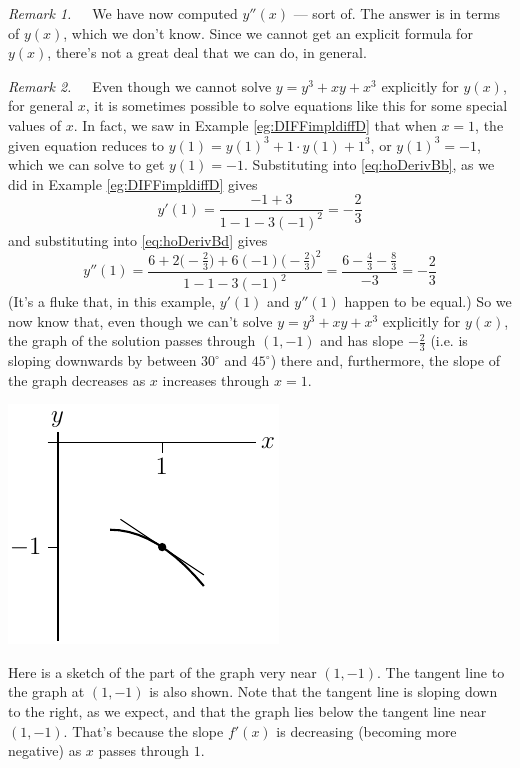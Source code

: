 \begin{eg}
\noindent\emph{Remark 1.}\ \ \ We have now computed $y''(x)$ --- sort of.
The answer is in terms of $y(x)$, which we don't know. Since we cannot
get an explicit formula for $y(x)$, there's not a great deal that we can do,
in general.

\noindent\emph{Remark 2.}\ \ \ Even though we cannot solve
$y=y^3+xy+x^3$ explicitly for $y(x)$, for general $x$, it is sometimes
possible to solve equations like this for some special values of $x$.
In fact, we saw in Example \ref{eg:DIFFimpldiffD} that when $x=1$,
the given equation reduces to $y(1)=y(1)^3+1\cdot y(1)+1^3$, or $y(1)^3=-1$,
which we can solve to get $y(1)=-1$. Substituting into \eqref{eq:hoDerivBb},
as we did in  Example \ref{eg:DIFFimpldiffD} gives
\begin{equation*}
y'(1) = \frac{-1+3}{1-1-3(-1)^2} = -\frac{2}{3}
\end{equation*}
and substituting into \eqref{eq:hoDerivBd} gives
\begin{equation*}
y''(1) = \frac{6+2\big(-\frac{2}{3}\big)+6(-1)\big(-\frac{2}{3}\big)^2}
                             {1-1-3(-1)^2}
   =\frac{6-\frac{4}{3}-\frac{8}{3}}{-3}
   = -\frac{2}{3}
\end{equation*}
(It's a fluke that, in this example, $y'(1)$ and $y''(1)$ happen to be equal.)
So we now know that, even though we can't solve $y=y^3+xy+x^3$ explicitly for
$y(x)$, the graph of the solution passes through $(1,-1)$ and has slope
$-\frac{2}{3}$ (i.e. is sloping downwards by between $30^\circ$ and $45^\circ$)
there and, furthermore, the slope of the graph decreases as $x$
increases through $x=1$.

\begin{efig}
 \begin{center}
 \includegraphics{concaveDown}
 \end{center}
\end{efig}
Here is a sketch of the part of the graph very near $(1, -1)$. The tangent line to the
graph at $(1, -1)$ is also shown. Note that the tangent line is sloping down to the right,
as we expect, and that the graph lies below the tangent line near $(1,-1)$. That's because
the slope $f'(x)$ is decreasing (becoming more negative) as $x$ passes through $1$.


\end{eg}

